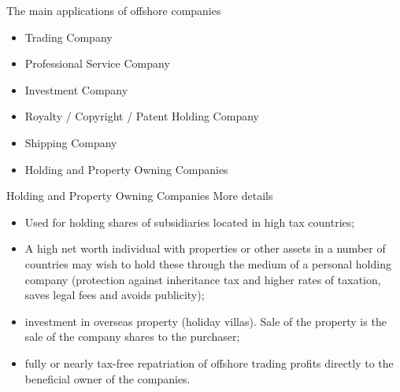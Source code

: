 \documentclass[international_finance_p2.tex]{subfiles}
\begin{document}
\begin{frame}{The main applications of offshore companies}
\begin{itemize}[<+->]
\item
Trading Company
\item
Professional Service Company
\item
Investment Company
\item
Royalty / Copyright / Patent Holding Company
\item
Shipping Company
\item
Holding and Property Owning Companies
\end{itemize}
\end{frame}
\begin{frame}{Holding and Property Owning Companies}
{More details}
\begin{itemize}[<+->]
\item
Used for holding shares of subsidiaries located in high tax countries;
\item
A high net worth individual with properties or other assets in a number of countries may wish to hold these through the medium of a personal holding company (protection against inheritance tax and higher rates of taxation, saves legal fees and avoids publicity);
\item
investment in overseas property (holiday villas). Sale of the property is the sale of the company shares to the purchaser;
\item
fully or nearly tax-free repatriation of offshore trading profits directly to the beneficial owner of the companies.
\end{itemize}
\end{frame}
\end{document}
